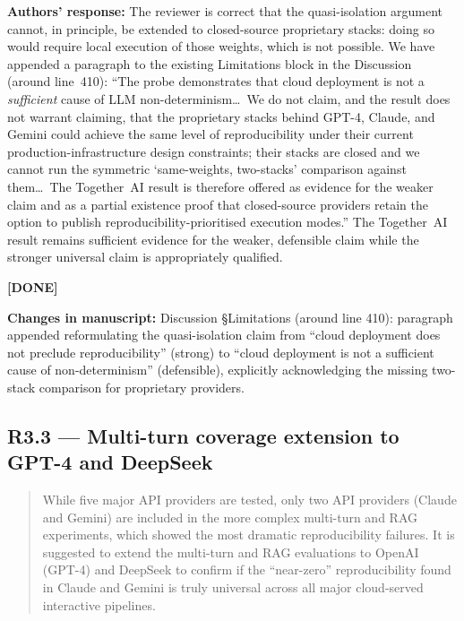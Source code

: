 \documentclass[11pt,a4paper]{article}
\newenvironment{revquote}{%
  \begin{quote}\small\itshape\color{revgray}
}{%
  \end{quote}
}
\newcommand{\response}[1]{\par\noindent\textbf{\color{revgreen}Authors' response:} #1\par}
\newcommand{\changes}[1]{\par\noindent\textbf{\color{revblue}Changes in manuscript:} #1\par}
\newcommand{\done}{\color{revgreen}\textbf{[DONE]}}
\begin{document}
\response{The reviewer is correct that the quasi-isolation argument cannot, in principle, be extended to closed-source proprietary stacks: doing so would require local execution of those weights, which is not possible. We have appended a paragraph to the existing Limitations block in the Discussion (around line~410): ``The probe demonstrates that cloud deployment is not a \emph{sufficient} cause of LLM non-determinism\ldots\ We do not claim, and the result does not warrant claiming, that the proprietary stacks behind GPT-4, Claude, and Gemini could achieve the same level of reproducibility under their current production-infrastructure design constraints; their stacks are closed and we cannot run the symmetric `same-weights, two-stacks' comparison against them\ldots\ The Together~AI result is therefore offered as evidence for the weaker claim and as a partial existence proof that closed-source providers retain the option to publish reproducibility-prioritised execution modes.'' The Together~AI result remains sufficient evidence for the weaker, defensible claim while the stronger universal claim is appropriately qualified.} \done

\changes{Discussion §Limitations (around line 410): paragraph appended reformulating the quasi-isolation claim from ``cloud deployment does not preclude reproducibility'' (strong) to ``cloud deployment is not a sufficient cause of non-determinism'' (defensible), explicitly acknowledging the missing two-stack comparison for proprietary providers.}

\subsection*{R3.3 --- Multi-turn coverage extension to GPT-4 and DeepSeek}

\begin{revquote}
While five major API providers are tested, only two API providers (Claude and Gemini) are included in the more complex multi-turn and RAG experiments, which showed the most dramatic reproducibility failures. It is suggested to extend the multi-turn and RAG evaluations to OpenAI (GPT-4) and DeepSeek to confirm if the ``near-zero'' reproducibility found in Claude and Gemini is truly universal across all major cloud-served interactive pipelines.
\end{revquote}
\end{document}
